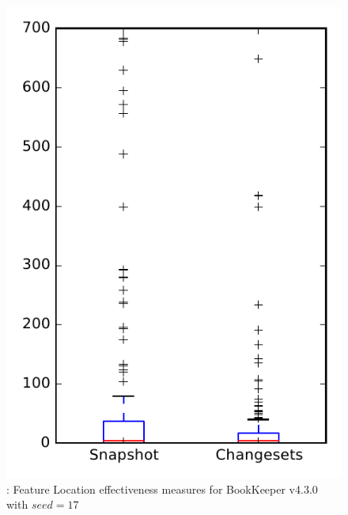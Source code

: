 
\begin{figure}
\centering
\includegraphics[height=0.4\textheight]{figures/flt_seed/rq1_bookkeeper_17}
\caption{\rone: Feature Location effectiveness measures for BookKeeper v4.3.0 with $seed=17$}
\label{fig:flt_seed:rq1:bookkeeper}
\end{figure}
